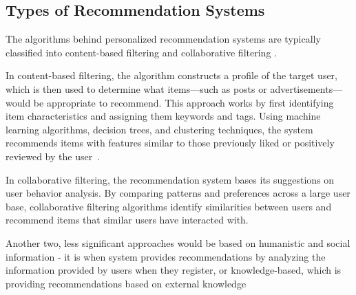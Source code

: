 \documentclass[10pt,twocolumn,twoside,a4paper]{article} %
\begin{document}
\subsection{Types of Recommendation Systems}
The algorithms behind personalized recommendation systems are typically classified into content-based filtering and collaborative filtering \cite{raghavendra2018personalized}.

In content-based filtering, the algorithm constructs a profile of the target user, which is then used to determine what items—such as posts or advertisements—would be appropriate to recommend. This approach works by first identifying item characteristics and assigning them keywords and tags. Using machine learning algorithms, decision trees, and clustering techniques, the system recommends items with features similar to those previously liked or positively reviewed by the user~\cite{raghavendra2018personalized}\cite{contentvscollaborative}.

In collaborative filtering, the recommendation system bases its suggestions on user behavior analysis. By comparing patterns and preferences across a large user base, collaborative filtering algorithms identify similarities between users and recommend items that similar users have interacted with.

Another two, less significant approaches would be based on humanistic and social information - it is when system provides recommendations by
analyzing the information provided by users when they register, or knowledge-based, which is providing recommendations based on external knowledge
\end{document}
